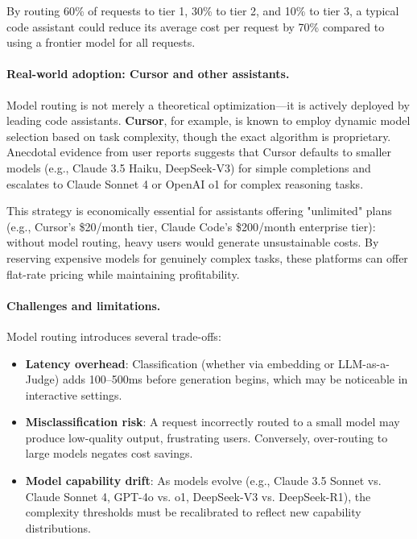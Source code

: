 \documentclass[english]{article}
\begin{document}
By routing 60\% of requests to tier 1, 30\% to tier 2, and 10\% to tier 3, a typical code assistant could reduce its average cost per request by 70\% compared to using a frontier model for all requests.

\paragraph{Real-world adoption: Cursor and other assistants.}

Model routing is not merely a theoretical optimization—it is actively deployed by leading code assistants. \textbf{Cursor}, for example, is known to employ dynamic model selection based on task complexity, though the exact algorithm is proprietary. Anecdotal evidence from user reports suggests that Cursor defaults to smaller models (e.g., Claude 3.5 Haiku, DeepSeek-V3) for simple completions and escalates to Claude Sonnet 4 or OpenAI o1 for complex reasoning tasks.

This strategy is economically essential for assistants offering "unlimited" plans (e.g., Cursor's \$20/month tier, Claude Code's \$200/month enterprise tier): without model routing, heavy users would generate unsustainable costs. By reserving expensive models for genuinely complex tasks, these platforms can offer flat-rate pricing while maintaining profitability.

\paragraph{Challenges and limitations.}

Model routing introduces several trade-offs:
\begin{itemize}
    \item \textbf{Latency overhead}: Classification (whether via embedding or LLM-as-a-Judge) adds 100--500ms before generation begins, which may be noticeable in interactive settings.
    \item \textbf{Misclassification risk}: A request incorrectly routed to a small model may produce low-quality output, frustrating users. Conversely, over-routing to large models negates cost savings.
    \item \textbf{Model capability drift}: As models evolve (e.g., Claude 3.5 Sonnet vs. Claude Sonnet 4, GPT-4o vs. o1, DeepSeek-V3 vs. DeepSeek-R1), the complexity thresholds must be recalibrated to reflect new capability distributions.
\end{itemize}
\end{document}
